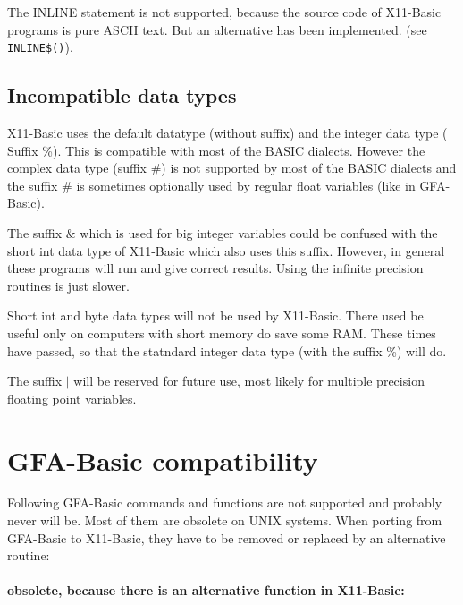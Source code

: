 The INLINE statement is not supported, because the  source code of X11-Basic 
programs is pure ASCII text. But an alternative has been implemented. (see
\verb|INLINE$()|).

\subsection*{Incompatible data types}

X11-Basic uses the default datatype (without suffix) and the integer data type (
Suffix \%). This is compatible with most of the BASIC dialects. However the
complex data type (suffix \#) is not supported by most of the BASIC dialects and the 
suffix \# is sometimes optionally used by regular float variables 
(like in GFA-Basic).

The suffix \& which is used for big integer variables could be confused with the 
short int data type of X11-Basic which also uses this suffix. However, in 
general these programs will run and give correct results. Using the 
infinite precision routines is just slower.

Short int and byte data types will not be used by X11-Basic. There used be 
useful only on computers with short memory do save some RAM. 
These times have passed, so that the statndard integer data type 
(with the suffix \%) will do.

The suffix $|$ will be reserved for future use, most likely for multiple
precision floating point variables.


\section{GFA-Basic compatibility}
\label{gfacompat}

Following GFA-Basic commands and functions are not supported and probably never
will be. Most of them are obsolete on UNIX systems. When porting from GFA-Basic
to X11-Basic, they have to be removed or replaced by an alternative routine:

\paragraph{obsolete, because there is an alternative function in X11-Basic:}

